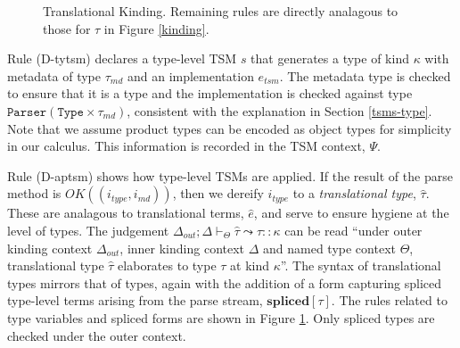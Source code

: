 \documentclass{sig-alternate}[10pt]
\makeatletter
\newcommand\BeraMonottfamily{%
  \def\fvm@Scale{0.85}%
  \fontfamily{fvm}\selectfont%
}
\newcommand{\flyingbox}[1]{\fbox{{#1}}}
\newcommand{\mycaption}[1]{\vspace{-5px}\caption{#1}\vspace{-5px}}
\newcommand{\lstinlinew}[1]{{\scriptsize\BeraMonottfamily #1}}
\makeatother
\begin{document}
\begin{figure}[t]
\flyingbox{$\Delta;\Delta\vdash_{\Theta}\hat{\tau}\rightsquigarrow \tau::\kappa$}
\begin{center}

\noLine
\BIC{}
\DP
\end{center}
\begin{center}

\DP
\end{center}
\mycaption{Translational Kinding. Remaining rules are directly analagous to those for $\tau$ in Figure \ref{kinding}.}
\label{tr-kinding}
\end{figure}
Rule (D-tytsm) declares a type-level TSM $s$ that generates a type of kind $\kappa$ with metadata of type $\tau_{md}$ and an implementation $e_{tsm}$. The metadata type is checked to ensure that it is a type and the implementation is checked against type $\mathtt{Parser}(\mathtt{Type} \times \tau_{md})$, consistent with the explanation in Section \ref{tsms-type}. Note that we assume product types can be encoded as object types for simplicity in our calculus. This information is recorded in the TSM context, $\Psi$.

Rule (D-aptsm) shows how type-level TSMs are applied. If the result of the \lstinlinew{parse} method is $OK((i_{type}, i_{md}))$, then we dereify $i_{type}$ to a \emph{translational type}, $\hat{\tau}$. These are analagous to translational terms, $\hat{e}$, and serve to ensure hygiene at the level of types. The judgement $\Delta_{out}; \Delta \vdash_{\Theta} \hat{\tau} \leadsto \tau :: \kappa$ can be read ``under outer kinding context $\Delta_{out}$, inner kinding context $\Delta$ and named type context $\Theta$, translational type $\hat\tau$ elaborates to type $\tau$ at kind $\kappa$''. The syntax of translational types mirrors that of types, again with the addition of a form capturing spliced type-level terms arising from the parse stream, $\textbf{spliced}[\tau]$. The rules related to type variables and spliced forms are shown in Figure \ref{tr-kinding}. Only spliced types are checked under the outer context. 
\end{document}
